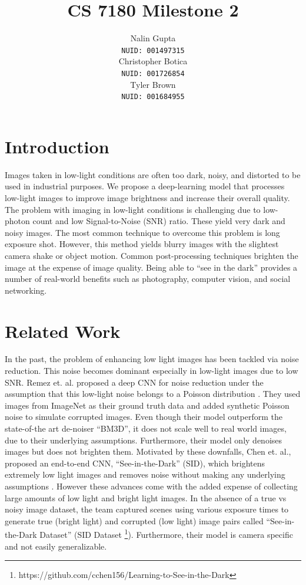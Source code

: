 \documentclass{article}
\title{CS 7180 Milestone 2}
\author{%
  Nalin Gupta \\
  \texttt{NUID: 001497315} \\
  \And
  Christopher Botica\\
  \texttt{NUID: 001726854} \\
  \And
  Tyler Brown\\
  \texttt{NUID: 001684955} \\
}
\begin{document}

\maketitle

\section{Introduction}

Images taken in low-light conditions are often too dark, noisy, and
distorted to be used in industrial purposes. We propose a deep-learning
model that processes low-light images to improve image brightness and
increase their overall quality. The problem with imaging in low-light
conditions is challenging due to low-photon count and low
Signal-to-Noise (SNR) ratio. These yield very dark and noisy images. The
most common technique to overcome this problem is long exposure shot.
However, this method yields blurry images with the slightest camera shake
or object motion\cite{chen2018learning}. Common post-processing
techniques brighten the image at the expense of image quality. Being able to
``see in the dark'' provides a number of real-world benefits such as
photography, computer vision, and social networking.

\section{Related Work}

In the past, the problem of enhancing low light images has been tackled via
noise reduction. This noise becomes dominant especially in low-light images
due to low SNR. Remez et. al. proposed a deep CNN for noise reduction under
the assumption that this low-light noise belongs to a Poisson
distribution \cite{remez2017deep}.  They used images from ImageNet
\cite{imagenet_cvpr09} as their ground truth data
and added synthetic Poisson noise to simulate corrupted images. Even though
their model outperform the state-of-the art de-noiser ``BM3D'', it does not
scale well to real world images, due to their underlying assumptions.
Furthermore, their model only denoises images but does not brighten them.
Motivated by these downfalls, Chen et. al., proposed an end-to-end CNN,
``See-in-the-Dark'' (SID), which brightens extremely low light images and
removes noise without making any underlying assumptions
\cite{chen2018learning}. However these advances come with the added expense
of collecting large amounts of low
light and bright light images. In the absence of a true vs noisy image
dataset, the team captured scenes using various exposure times to generate
true (bright light) and corrupted (low light) image pairs called
``See-in-the-Dark Dataset'' (SID Dataset
\footnote{https://github.com/cchen156/Learning-to-See-in-the-Dark}). Furthermore,
their model is camera specific and not easily generalizable.\newline
\end{document}
